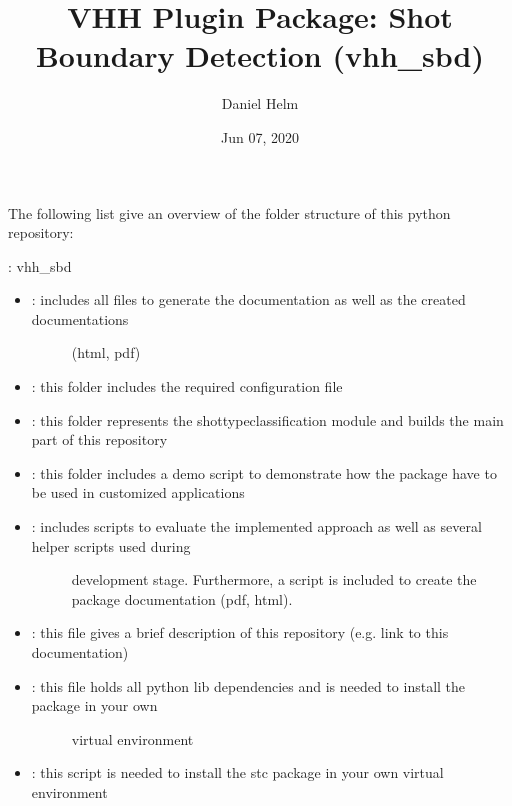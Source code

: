 \documentclass[letterpaper,10pt,english,openany,oneside]{sphinxmanual}
\title{VHH Plugin Package: Shot Boundary Detection (vhh\_sbd)}
\date{Jun 07, 2020}
\author{Daniel Helm}
\begin{document}
\pagestyle{empty}
\sphinxmaketitle
\pagestyle{plain}
\sphinxtableofcontents
\pagestyle{normal}
\label{\detokenize{index::doc}}


The following list give an overview of the folder structure of this python repository:

: vhh\_sbd
\begin{itemize}
\item {} \begin{description}
\item[{: includes all files to generate the documentation as well as the created documentations}] \leavevmode
(html, pdf)

\end{description}

\item {} 
: this folder includes the required configuration file

\item {} 
: this folder represents the shot\sphinxhyphen{}type\sphinxhyphen{}classification module and builds the main part of this repository

\item {} 
: this folder includes a demo script to demonstrate how the package have to be used in customized applications

\item {} \begin{description}
\item[{: includes scripts to evaluate the implemented approach as well as several helper scripts used during}] \leavevmode
development stage. Furthermore, a script is included to create the package documentation (pdf, html).

\end{description}

\item {} 
: this file gives a brief description of this repository (e.g. link to this documentation)

\item {} \begin{description}
\item[{: this file holds all python lib dependencies and is needed to install the package in your own}] \leavevmode
virtual environment

\end{description}

\item {} 
: this script is needed to install the stc package in your own virtual environment

\end{itemize}
\end{document}

